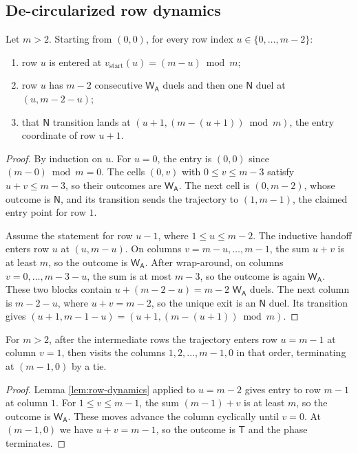\documentclass[12pt]{article}
\newcommand{\WA}{\mathsf{W_A}}
\newcommand{\TT}{\mathsf{T}}
\newcommand{\NN}{\mathsf{N}}
\begin{document}
\subsection{De-circularized row dynamics}
\begin{lemma}\label{lem:row-dynamics}
Let $m>2$. Starting from $(0,0)$, for every row index $u\in\{0,\dots,m-2\}$:
\begin{enumerate}[label=(\roman*),nosep]
    \item row $u$ is entered at $v_{\mathrm{start}}(u)=(m-u)\bmod m$;
    \item row $u$ has $m-2$ consecutive $\WA$ duels and then one $\NN$ duel at $(u,m-2-u)$;
    \item that $\NN$ transition lands at $(u+1,(m-(u+1))\bmod m)$, the entry coordinate of row $u+1$.
\end{enumerate}
\end{lemma}
\begin{proof}
By induction on $u$. For $u=0$, the entry is $(0,0)$ since $(m-0)\bmod m=0$. The cells $(0,v)$ with $0\le v\le m-3$ satisfy $u+v\le m-3$, so their outcomes are $\WA$. The next cell is $(0,m-2)$, whose outcome is $\NN$, and its transition sends the trajectory to $(1,m-1)$, the claimed entry point for row $1$.

Assume the statement for row $u-1$, where $1\le u\le m-2$. The inductive handoff enters row $u$ at $(u,m-u)$. On columns $v=m-u,\dots,m-1$, the sum $u+v$ is at least $m$, so the outcome is $\WA$. After wrap-around, on columns $v=0,\dots,m-3-u$, the sum is at most $m-3$, so the outcome is again $\WA$. These two blocks contain $u+(m-2-u)=m-2$ $\WA$ duels. The next column is $m-2-u$, where $u+v=m-2$, so the unique exit is an $\NN$ duel. Its transition gives $(u+1,m-1-u)=(u+1,(m-(u+1))\bmod m)$.
\end{proof}

\begin{lemma}\label{lem:final-row}
For $m>2$, after the intermediate rows the trajectory enters row $u=m-1$ at column $v=1$, then visits the columns $1,2,\dots,m-1,0$ in that order, terminating at $(m-1,0)$ by a tie.
\end{lemma}
\begin{proof}
Lemma \ref{lem:row-dynamics} applied to $u=m-2$ gives entry to row $m-1$ at column $1$. For $1\le v\le m-1$, the sum $(m-1)+v$ is at least $m$, so the outcome is $\WA$. These moves advance the column cyclically until $v=0$. At $(m-1,0)$ we have $u+v=m-1$, so the outcome is $\TT$ and the phase terminates.
\end{proof}
\end{document}

